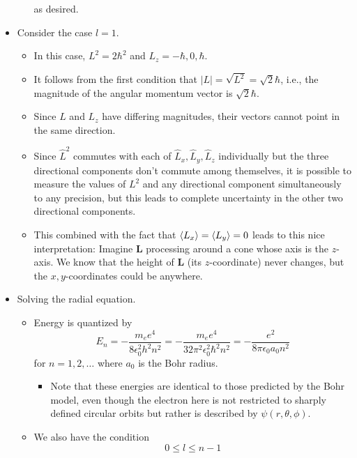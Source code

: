 \documentclass[../notes.tex]{subfiles}
\begin{document}
\begin{itemize}
\begin{itemize}
        as desired.
    \end{itemize}
    \item Consider the case $l=1$.
    \begin{itemize}
        \item In this case, $L^2=2\hbar^2$ and $L_z=-\hbar,0,\hbar$.
        \item It follows from the first condition that $|L|=\sqrt{L^2}=\sqrt{2}\hbar$, i.e., the magnitude of the angular momentum vector is $\sqrt{2}\hbar$.
        \item Since $L$ and $L_z$ have differing magnitudes, their vectors cannot point in the same direction.
        \item Since $\hat{L}^2$ commutes with each of $\hat{L}_x,\hat{L}_y,\hat{L}_z$ individually but the three directional components don't commute among themselves, it is possible to measure the values of $L^2$ and any directional component simultaneously to any precision, but this leads to complete uncertainty in the other two directional components.
        \item This combined with the fact that $\langle{L_x}\rangle=\langle{L_y}\rangle=0$ leads to this nice interpretation: Imagine $\mathbf{L}$ processing around a cone whose axis is the $z$-axis. We know that the height of $\mathbf{L}$ (its $z$-coordinate) never changes, but the $x,y$-coordinates could be anywhere.
    \end{itemize}
    \item Solving the radial equation.
    \begin{itemize}
        \item Energy is quantized by
        \begin{equation*}
            E_n = -\frac{m_ee^4}{8\epsilon_0^2h^2n^2}
            = -\frac{m_ee^4}{32\pi^2\epsilon_0^2\hbar^2n^2}
            = -\frac{e^2}{8\pi\epsilon_0a_0n^2}
        \end{equation*}
        for $n=1,2,\dots$ where $a_0$ is the Bohr radius.
        \begin{itemize}
            \item Note that these energies are identical to those predicted by the Bohr model, even though the electron here is not restricted to sharply defined circular orbits but rather is described by $\psi(r,\theta,\phi)$.
        \end{itemize}
        \item We also have the condition
        \begin{equation*}
            0 \leq l \leq n-1

\end{equation*}
\end{itemize}
\end{itemize}
\end{document}
